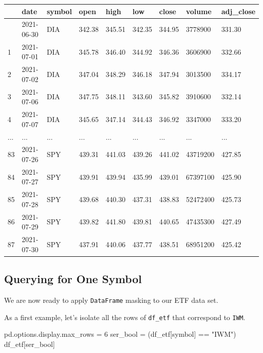 \documentclass[
  letterpaper,
  DIV=11,
  numbers=noendperiod]{scrreprt}
\newenvironment{Shaded}{\begin{snugshade}}{\end{snugshade}}
\newcommand{\DecValTok}[1]{\textcolor[rgb]{0.68,0.00,0.00}{#1}}
\newcommand{\NormalTok}[1]{\textcolor[rgb]{0.00,0.23,0.31}{#1}}
\newcommand{\OperatorTok}[1]{\textcolor[rgb]{0.37,0.37,0.37}{#1}}
\newcommand{\StringTok}[1]{\textcolor[rgb]{0.13,0.47,0.30}{#1}}
\begin{document}
\begin{longtable}[]{@{}lllllllll@{}}
\toprule\noalign{}
& date & symbol & open & high & low & close & volume & adj\_close \\
\midrule\noalign{}
\endhead
\bottomrule\noalign{}
\endlastfoot
0 & 2021-06-30 & DIA & 342.38 & 345.51 & 342.35 & 344.95 & 3778900 &
331.30 \\
1 & 2021-07-01 & DIA & 345.78 & 346.40 & 344.92 & 346.36 & 3606900 &
332.66 \\
2 & 2021-07-02 & DIA & 347.04 & 348.29 & 346.18 & 347.94 & 3013500 &
334.17 \\
3 & 2021-07-06 & DIA & 347.75 & 348.11 & 343.60 & 345.82 & 3910600 &
332.14 \\
4 & 2021-07-07 & DIA & 345.65 & 347.14 & 344.43 & 346.92 & 3347000 &
333.20 \\
... & ... & ... & ... & ... & ... & ... & ... & ... \\
83 & 2021-07-26 & SPY & 439.31 & 441.03 & 439.26 & 441.02 & 43719200 &
427.85 \\
84 & 2021-07-27 & SPY & 439.91 & 439.94 & 435.99 & 439.01 & 67397100 &
425.90 \\
85 & 2021-07-28 & SPY & 439.68 & 440.30 & 437.31 & 438.83 & 52472400 &
425.73 \\
86 & 2021-07-29 & SPY & 439.82 & 441.80 & 439.81 & 440.65 & 47435300 &
427.49 \\
87 & 2021-07-30 & SPY & 437.91 & 440.06 & 437.77 & 438.51 & 68951200 &
425.42 \\
\end{longtable}

\hypertarget{querying-for-one-symbol}{%
\subsection{Querying for One Symbol}\label{querying-for-one-symbol}}

We are now ready to apply \texttt{DataFrame} masking to our ETF data
set.

As a first example, let's isolate all the rows of \texttt{df\_etf} that
correspond to \texttt{IWM}.

\begin{Shaded}
\begin{Highlighting}[]
\NormalTok{pd.options.display.max\_rows }\OperatorTok{=} \DecValTok{6}
\NormalTok{ser\_bool }\OperatorTok{=}\NormalTok{ (df\_etf[}\StringTok{\textquotesingle{}symbol\textquotesingle{}}\NormalTok{] }\OperatorTok{==} \StringTok{"IWM"}\NormalTok{)}
\NormalTok{df\_etf[ser\_bool]}
\end{Highlighting}
\end{Shaded}
\end{document}
